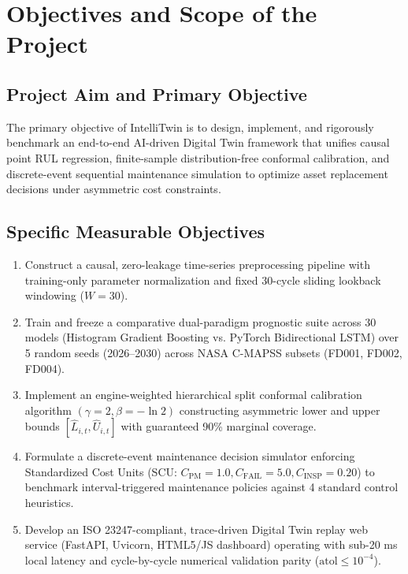 \documentclass[12pt,a4paper]{article}
\begin{document}
\section{Objectives and Scope of the Project}

\subsection{Project Aim and Primary Objective}
The primary objective of IntelliTwin is to design, implement, and rigorously benchmark an end-to-end AI-driven Digital Twin framework that unifies causal point RUL regression, finite-sample distribution-free conformal calibration, and discrete-event sequential maintenance simulation to optimize asset replacement decisions under asymmetric cost constraints.

\subsection{Specific Measurable Objectives}
\begin{enumerate}[label=\textbf{O\arabic*:},leftmargin=2.0em]
    \item Construct a causal, zero-leakage time-series preprocessing pipeline with training-only parameter normalization and fixed 30-cycle sliding lookback windowing ($W=30$).
    \item Train and freeze a comparative dual-paradigm prognostic suite across 30 models (Histogram Gradient Boosting vs. PyTorch Bidirectional LSTM) over 5 random seeds (2026--2030) across NASA C-MAPSS subsets (FD001, FD002, FD004).
    \item Implement an engine-weighted hierarchical split conformal calibration algorithm $(\gamma=2, \beta=-\ln 2)$ constructing asymmetric lower and upper bounds $[\hat{L}_{i,t}, \hat{U}_{i,t}]$ with guaranteed 90\% marginal coverage.
    \item Formulate a discrete-event maintenance decision simulator enforcing Standardized Cost Units (SCU: $C_{\text{PM}}=1.0, C_{\text{FAIL}}=5.0, C_{\text{INSP}}=0.20$) to benchmark interval-triggered maintenance policies against 4 standard control heuristics.
    \item Develop an ISO 23247-compliant, trace-driven Digital Twin replay web service (FastAPI, Uvicorn, HTML5/JS dashboard) operating with sub-20 ms local latency and cycle-by-cycle numerical validation parity ($\text{atol} \le 10^{-4}$).
\end{enumerate}
\end{document}
